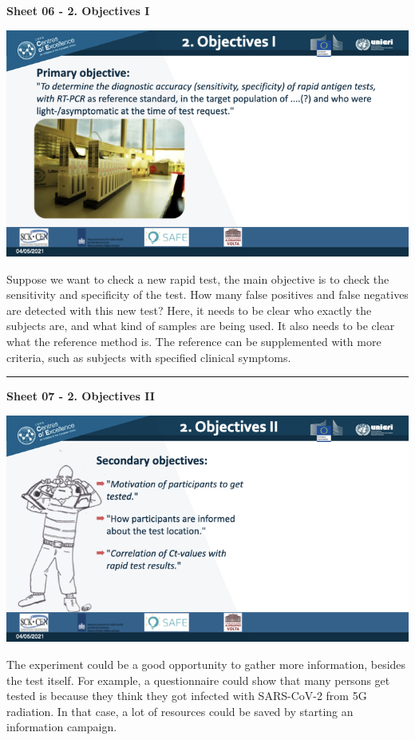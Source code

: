 \documentclass[
]{book}
\begin{document}
\textbf{Sheet 06 - 2. Objectives I}

\includegraphics{images/m03/m03_validation_of_test_kits_v2_2.006.jpeg}

Suppose we want to check a new rapid test, the main objective is to
check the sensitivity and specificity of the test. How many false
positives and false negatives are detected with this new test? Here, it
needs to be clear who exactly the subjects are, and what kind of samples
are being used. It also needs to be clear what the reference method is.
The reference can be supplemented with more criteria, such as subjects
with specified clinical symptoms.

\begin{center}\rule{0.5\linewidth}{0.5pt}\end{center}

\textbf{Sheet 07 - 2. Objectives II}

\includegraphics{images/m03/m03_validation_of_test_kits_v2_2.007.jpeg}

The experiment could be a good opportunity to gather more information,
besides the test itself. For example, a questionnaire could show that
many persons get tested is because they think they got infected with
SARS-CoV-2 from 5G radiation. In that case, a lot of resources could be
saved by starting an information campaign.
\end{document}
